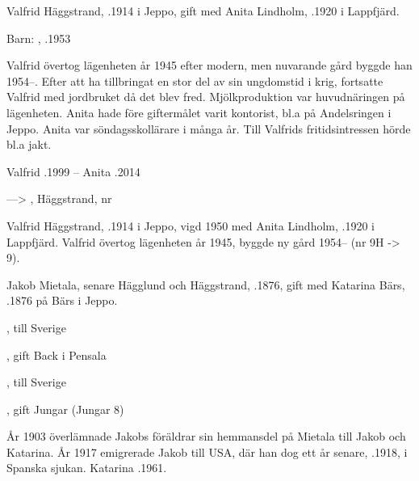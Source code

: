 Valfrid Häggstrand, .1914 i Jeppo, gift med Anita Lindholm, .1920 i Lappfjärd.

Barn: , .1953

Valfrid övertog lägenheten år 1945 efter modern, men nuvarande gård byggde han 1954--. Efter att ha tillbringat en stor del av sin ungdomstid i krig, fortsatte Valfrid med jordbruket då det blev fred. Mjölkproduktion var huvudnäringen på lägenheten. Anita hade före giftermålet varit kontorist, bl.a på Andelsringen i Jeppo. Anita var söndagsskollärare i många år. Till Valfrids fritidsintressen hörde bl.a jakt.

Valfrid .1999  --  Anita .2014


---> , Häggstrand, nr 

Valfrid Häggstrand, .1914 i Jeppo, vigd 1950 med Anita Lindholm, .1920 i Lappfjärd. Valfrid övertog lägenheten år 1945, byggde ny gård 1954-- (nr 9H -> 9).\jhvspace{}


Jakob Mietala, senare Hägglund och Häggstrand, .1876, gift med Katarina Bärs, .1876 på Bärs i Jeppo.
\begin{jhchildren}
  \item {}
  \item {}, till Sverige
  \item {}
  \item {}, gift Back i Pensala
  \item {}, till Sverige
  \item {}, gift Jungar (Jungar 8)
  \item {}
  \item {}
\end{jhchildren}

År 1903 överlämnade Jakobs föräldrar sin hemmansdel på Mietala till Jakob och Katarina. År 1917 emigrerade Jakob till USA, där han dog ett år senare, .1918, i Spanska sjukan. Katarina .1961.


